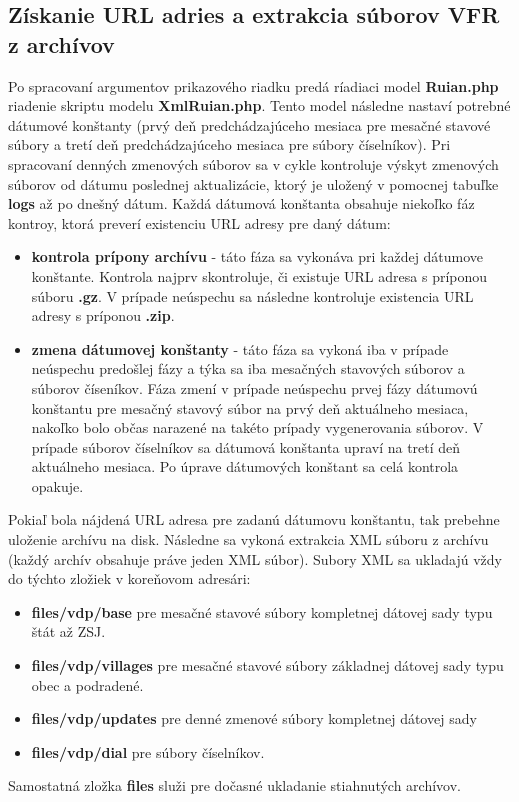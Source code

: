 \subsection{Získanie URL adries a extrakcia súborov VFR z archívov}
Po spracovaní argumentov prikazového riadku predá ríadiaci model {\bf Ruian.php} riadenie skriptu modelu {\bf XmlRuian.php}. Tento model následne nastaví potrebné dátumové konštanty (prvý deň predchádzajúceho mesiaca pre mesačné stavové súbory a tretí deň predchádzajúceho mesiaca pre súbory číselníkov). Pri spracovaní denných zmenových súborov sa v cykle kontroluje  výskyt zmenových súborov od dátumu poslednej aktualizácie, ktorý je uložený v pomocnej tabuľke {\bf logs} až po dnešný dátum. Každá dátumová konštanta obsahuje niekoľko fáz kontroy, ktorá preverí existenciu URL adresy pre daný dátum:
\begin{itemize}
    \item {{\bf kontrola prípony archívu} - táto fáza sa vykonáva pri každej dátumove konštante. Kontrola najprv skontroluje, či existuje URL adresa s príponou súboru {\bf .gz}. V prípade neúspechu sa následne kontroluje existencia URL adresy s príponou {\bf .zip}}.
    \item{{\bf zmena dátumovej konštanty} - táto fáza sa vykoná iba v prípade neúspechu predošlej fázy a týka sa iba mesačných stavových súborov a súborov číseníkov. Fáza zmení v prípade neúspechu prvej fázy dátumovú konštantu pre mesačný stavový súbor na prvý deň aktuálneho mesiaca, nakoľko bolo občas narazené na takéto prípady vygenerovania súborov. V prípade súborov číselníkov sa dátumová konštanta upraví na tretí deň aktuálneho mesiaca. Po úprave dátumových konštant sa celá kontrola opakuje.}
\end{itemize}
Pokiaľ bola nájdená URL adresa pre zadanú dátumovu konštantu, tak prebehne uloženie archívu na disk. Následne sa vykoná extrakcia XML súboru z archívu (každý archív obsahuje práve jeden XML súbor). Subory XML sa ukladajú vždy do týchto zložiek v koreňovom adresári: \begin{itemize}
    \item {\bf files/vdp/base} pre mesačné stavové súbory kompletnej dátovej sady typu štát až ZSJ.
    \item{\bf files/vdp/villages} pre mesačné stavové súbory základnej dátovej sady typu obec a podradené.
    \item{\bf files/vdp/updates} pre denné zmenové súbory kompletnej dátovej sady
    \item{\bf files/vdp/dial} pre súbory číselníkov.
\end{itemize}
Samostatná zložka {\bf files} služi pre dočasné ukladanie stiahnutých archívov.
